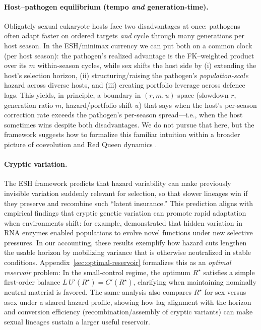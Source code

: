 \documentclass[11pt]{article}
\theoremstyle{upright}
\begin{document}
\paragraph{Host–pathogen equilibrium (tempo \emph{and} generation-time).}
Obligately sexual eukaryote hosts face two disadvantages at once: pathogens often adapt faster on ordered targets \emph{and} cycle 
through many generations per host season. In the ESH/minimax currency we can put both on a common clock (per host season): 
the pathogen’s realized advantage is the FK–weighted product over its $m$ within-season cycles, while sex shifts the host side 
by (i) extending the host’s selection horizon, (ii) structuring/raising the pathogen’s \emph{population-scale} hazard across diverse 
hosts, and (iii) creating portfolio leverage across defence lags. This yields, in principle, a boundary 
in \((r, m, u)\)-space (slowdown \(r\), generation ratio \(m\), hazard/portfolio shift \(u\)) that says when the host’s per-season correction 
rate exceeds the pathogen’s per-season spread—i.e., when the host sometimes wins despite both disadvantages. We do not pursue that 
here, but the framework suggests how to formalize this familiar intuition within a broader picture of coevolution and Red
Queen dynamics \citep{Hamilton1981} \citep{AndersonMay1982} \citep{Woolhouse2002}.

\paragraph{Cryptic variation.}
The ESH framework predicts that hazard variability can make previously invisible variation suddenly relevant for selection,
so that slower lineages win if they preserve and recombine such “latent insurance.”
This prediction aligns with empirical findings that cryptic genetic variation can promote rapid adaptation when environments shift:
for example, \citet{Hayden2011} demonstrated that hidden variation in RNA enzymes enabled populations to evolve novel functions
under new selective pressures. In our accounting, these results exemplify how hazard cuts lengthen the usable horizon by
mobilizing variance that is otherwise neutralized in stable conditions. Appendix~\ref{sec:optimal-reservoir} formalizes this as 
an \emph{optimal reservoir} problem: In the small-control regime, the optimum $R^\star$ satisfies a simple first-order 
balance $L\,U'(R^\star)=C'(R^\star)$, clarifying when maintaining nominally neutral material is favored. The same analysis also 
compares $R^\star$ for sex versus asex under a shared hazard profile, showing how lag alignment with the horizon and conversion 
efficiency (recombination/assembly of cryptic variants) can make sexual lineages sustain a larger useful reservoir.
\end{document}
